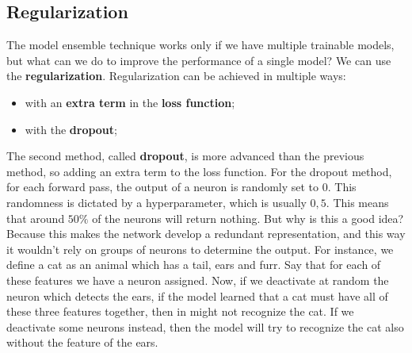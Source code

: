 \subsection{Regularization}

The model ensemble technique works only if we have multiple trainable models, but what can we do to improve the performance of a single model? We can use the \textbf{regularization}. Regularization can be achieved in multiple ways:
\begin{itemize}
    \item with an \textbf{extra term} in the \textbf{loss function};
    \item with the \textbf{dropout};
\end{itemize}


The second method, called \textbf{dropout}, is more advanced than the previous method, so adding an extra term to the loss function. For the dropout method, for each forward pass, the output of a neuron is randomly set to 0. This randomness is dictated by a hyperparameter, which is usually $0,5$. This means that around $50\%$ of the neurons will return nothing.
\nl
But why is this a good idea? Because this makes the network develop a redundant representation, and this way it wouldn't rely on groups of neurons to determine the output. For instance, we define a cat as an animal which has a tail, ears and furr. Say that for each of these features we have a neuron assigned. Now, if we deactivate at random the neuron which detects the ears, if the model learned that a cat must have all of these three features together, then in might not recognize the cat. If we deactivate some neurons instead, then the model will try to recognize the cat also without the feature of the ears.